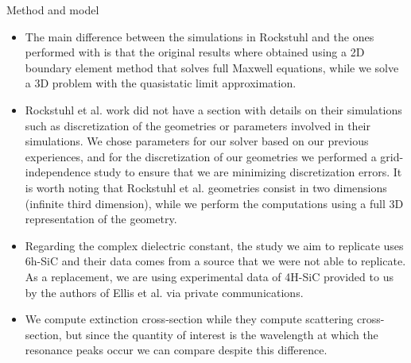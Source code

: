 Method and model
\begin{itemize}

\item {The main difference between the simulations in Rockstuhl and the ones performed with \pygbe is that the original results where obtained 
using a 2D boundary element method that solves full Maxwell equations, while we solve a 3D problem with the quasistatic limit approximation.}


\item{ Rockstuhl et al. work did not have a section with details on their simulations such as discretization of the geometries or parameters 
involved in their simulations. We chose parameters for our solver based on our previous experiences, and for the discretization of our 
geometries we performed a grid-independence study to ensure that we are minimizing discretization errors. It is worth noting that Rockstuhl
et al. geometries consist in two dimensions (infinite third dimension), while we perform the computations using a full 3D representation of the geometry.} 

\item {Regarding the complex dielectric constant, the study we aim to replicate uses 6h-SiC and their data comes from a source that we were not able
to replicate. As a replacement, we are using experimental data of 4H-SiC provided to us by the authors of Ellis et al. \cite{ellis2016} via 
private communications.}

\item {We compute extinction cross-section while they compute scattering cross-section, but since the quantity of interest is the wavelength
at which the resonance peaks occur we can compare despite this difference.}

\end{itemize}